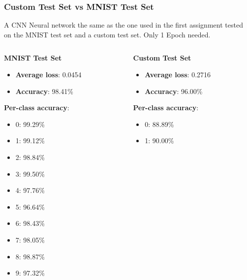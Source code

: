 \begin{frame}
    \frametitle{Custom Test Set vs MNIST Test Set}
    A CNN Neural network the same as the one used in the first assignment tested on the
    MNIST test set and a custom test set. Only 1 Epoch needed.\\
    
    \vspace{0.3cm}
    \tiny

    \begin{columns}
        \begin{column}{0.5\textwidth}
            \textbf{MNIST Test Set}
            \begin{itemize}
                \item \textbf{Average loss}: 0.0454
                \item \textbf{Accuracy}: 98.41\%
            \end{itemize}
            \textbf{Per-class accuracy}:
            \begin{itemize}
                \item 0: 99.29\%
                \item 1: 99.12\%
                \item 2: 98.84\%
                \item 3: 99.50\%
                \item 4: 97.76\%
                \item 5: 96.64\%
                \item 6: 98.43\%
                \item 7: 98.05\%
                \item 8: 98.87\%
                \item 9: 97.32\%
            \end{itemize}
        \end{column}
        \begin{column}{0.5\textwidth}
            \textbf{Custom Test Set}
            \begin{itemize}
                \item \textbf{Average loss}: 0.2716
                \item \textbf{Accuracy}: 96.00\%
            \end{itemize}
            \textbf{Per-class accuracy}:
            \begin{itemize}
                \item 0: 88.89\%
                \item 1: 90.00\%

\end{itemize}
\end{column}
\end{columns}
\end{frame}

